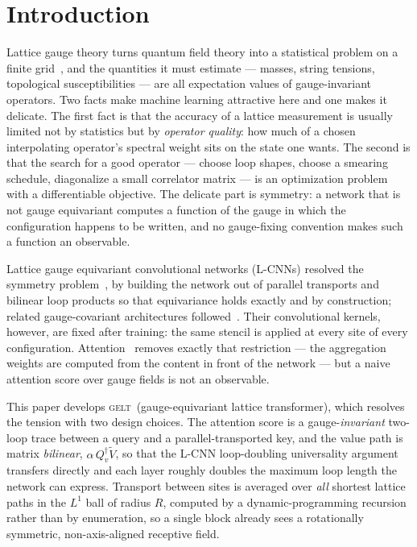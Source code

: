 \documentclass[aps,prl,reprint,superscriptaddress,nofootinbib]{revtex4-2}
\newcommand{\GELT}{\textsc{gelt}}
\begin{document}
\maketitle

\section{Introduction}

Lattice gauge theory turns quantum field theory into a statistical problem on a
finite grid~\cite{Wilson1974}, and the quantities it must estimate --- masses,
string tensions, topological susceptibilities --- are all expectation values of
gauge-invariant operators. Two facts make machine learning attractive here and
one makes it delicate. The first fact is that the accuracy of a lattice
measurement is usually limited not by statistics but by \emph{operator quality}:
how much of a chosen interpolating operator's spectral weight sits on the state
one wants. The second is that the search for a good operator --- choose loop
shapes, choose a smearing schedule, diagonalize a small correlator matrix --- is
an optimization problem with a differentiable objective. The delicate part is
symmetry: a network that is not gauge equivariant computes a function of the
gauge in which the configuration happens to be written, and no gauge-fixing
convention makes such a function an observable.

Lattice gauge equivariant convolutional networks (L-CNNs) resolved the symmetry
problem~\cite{Favoni2022}, by building the network out of parallel transports and
bilinear loop products so that equivariance holds exactly and by construction;
related gauge-covariant architectures followed~\cite{NagaiTomiya2021,CASK2025}.
Their convolutional kernels, however, are fixed after training: the same stencil
is applied at every site of every configuration. Attention~\cite{Vaswani2017}
removes exactly that restriction --- the aggregation weights are computed from
the content in front of the network --- but a naive attention score over gauge
fields is not an observable.

This paper develops \GELT\ (gauge-equivariant lattice transformer), which
resolves the tension with two design choices. The attention score is a
gauge-\emph{invariant} two-loop trace between a query and a parallel-transported
key, and the value path is matrix \emph{bilinear}, $\alpha\,Q_v^\dagger\tilde V$,
so that the L-CNN loop-doubling universality argument transfers directly and
each layer roughly doubles the maximum loop length the network can express.
Transport between sites is averaged over \emph{all} shortest lattice paths in
the $L^1$ ball of radius $R$, computed by a dynamic-programming recursion rather
than by enumeration, so a single block already sees a rotationally symmetric,
non-axis-aligned receptive field.
\end{document}
